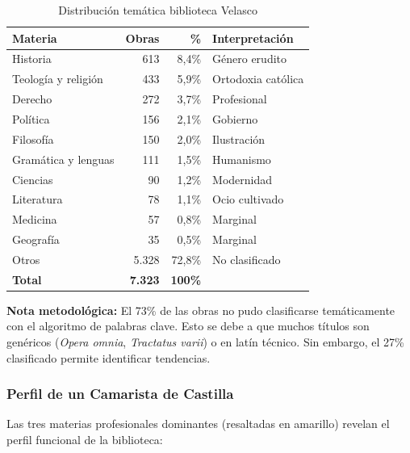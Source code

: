 \documentclass[12pt,a4paper]{article}
\begin{document}
\begin{table}[h]
\centering
\begin{tabular}{lrrl}
\toprule
\textbf{Materia} & \textbf{Obras} & \textbf{\%} & \textbf{Interpretación} \\
\midrule
Historia & 613 & 8,4\% & \cellcolor{yellow!30}Género erudito \\
Teología y religión & 433 & 5,9\% & Ortodoxia católica \\
Derecho & 272 & 3,7\% & \cellcolor{yellow!30}Profesional \\
Política & 156 & 2,1\% & \cellcolor{yellow!30}Gobierno \\
Filosofía & 150 & 2,0\% & Ilustración \\
Gramática y lenguas & 111 & 1,5\% & Humanismo \\
Ciencias & 90 & 1,2\% & Modernidad \\
Literatura & 78 & 1,1\% & Ocio cultivado \\
Medicina & 57 & 0,8\% & Marginal \\
Geografía & 35 & 0,5\% & Marginal \\
Otros & 5.328 & 72,8\% & No clasificado \\
\midrule
\textbf{Total} & \textbf{7.323} & \textbf{100\%} & \\
\bottomrule
\end{tabular}
\caption{Distribución temática biblioteca Velasco}
\end{table}

\textbf{Nota metodológica:} El 73\% de las obras no pudo clasificarse temáticamente con el algoritmo de palabras clave. Esto se debe a que muchos títulos son genéricos (\textit{Opera omnia}, \textit{Tractatus varii}) o en latín técnico. Sin embargo, el 27\% clasificado permite identificar tendencias.

\subsubsection{Perfil de un Camarista de Castilla}

Las tres materias profesionales dominantes (resaltadas en amarillo) revelan el perfil funcional de la biblioteca:
\end{document}
